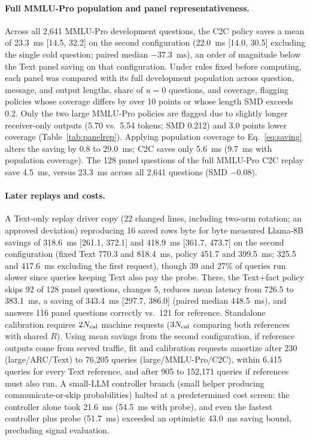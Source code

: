 \paragraph{Full MMLU-Pro population and panel representativeness.} Across all 2,641 MMLU-Pro development questions, the C2C policy saves a mean of 23.3~ms [14.5, 32.2] on the second configuration (22.0~ms [14.0, 30.5] excluding the single cold question; paired median $-37.3$~ms), an order of magnitude below the Text panel saving on that configuration. Under rules fixed before computing, each panel was compared with its full development population across question, message, and output lengths, share of $u=0$ questions, and coverage, flagging policies whose coverage differs by over 10 points or whose length SMD exceeds 0.2. Only the two large MMLU-Pro policies are flagged due to slightly longer receiver-only outputs (5.70 vs.\ 5.54 tokens; SMD 0.212) and 3.0 points lower coverage (Table~\ref{tab:panelrep}). Applying population coverage to Eq.~\eqref{eq:saving} alters the saving by 0.8 to 29.0~ms; C2C saves only 5.6~ms (9.7~ms with population coverage). The 128 panel questions of the full MMLU-Pro C2C replay save 4.5~ms, versus 23.3~ms across all 2,641 questions (SMD $-0.08$).

\paragraph{Later replays and costs.} A Text-only replay driver copy (22 changed lines, including two-arm rotation; an approved deviation) reproducing 16 saved rows byte for byte measured Llama-8B savings of 318.6~ms [261.1, 372.1] and 418.9~ms [361.7, 473.7] on the second configuration (fixed Text 770.3 and 818.4~ms, policy 451.7 and 399.5~ms; 325.5 and 417.6~ms excluding the first request), though 39 and 27\% of queries run slower since queries keeping Text also pay the probe. There, the Text+fact policy skips 92 of 128 panel questions, changes 5, reduces mean latency from 726.5 to 383.1~ms, a saving of 343.4~ms [297.7, 386.0] (paired median 448.5~ms), and answers 116 panel questions correctly vs.\ 121 for reference. Standalone calibration requires $2N_{\rm cal}$ machine requests ($3N_{\rm cal}$ comparing both references with shared $R$). Using mean savings from the second configuration, if reference outputs come from served traffic, fit and calibration requests amortize after 230 (large/ARC/Text) to 76,205 queries (large/MMLU-Pro/C2C), within 6,415 queries for every Text reference, and after 905 to 152,171 queries if references must also run. A small-LLM controller branch (small helper producing communicate-or-skip probabilities) halted at a predetermined cost screen: the controller alone took 21.6~ms (54.5~ms with probe), and even the fastest controller plus probe (51.7~ms) exceeded an optimistic 43.0~ms saving bound, precluding signal evaluation.

